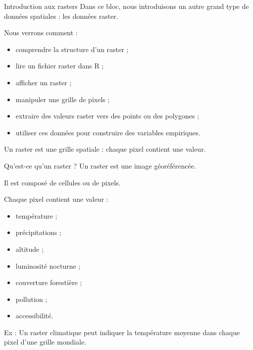 \documentclass[
  10pt,
  ignorenonframetext,
]{beamer}
\begin{document}
\begin{frame}{Introduction aux rasters}
\label{introduction-aux-rasters-1}
Dans ce bloc, nous introduisons un autre grand type de données spatiales
: les données raster.

Nous verrons comment :

\begin{itemize}
  \item comprendre la structure d’un raster ;
  \item lire un fichier raster dans R ;
  \item afficher un raster ;
  \item manipuler une grille de pixels ;
  \item extraire des valeurs raster vers des points ou des polygones ;
  \item utiliser ces données pour construire des variables empiriques.
\end{itemize}

Un raster est une grille spatiale : chaque pixel contient une valeur.
\end{frame}

\begin{frame}{Qu'est-ce qu'un raster ?}
\label{quest-ce-quun-raster}
Un raster est une image géoréférencée.

Il est composé de cellules ou de pixels.

Chaque pixel contient une valeur :

\begin{itemize}
  \item température ;
  \item précipitations ;
  \item altitude ;
  \item luminosité nocturne ;
  \item couverture forestière ;
  \item pollution ;
  \item accessibilité.
\end{itemize}

Ex : Un raster climatique peut indiquer la température moyenne dans
chaque pixel d'une grille mondiale.
\end{frame}
\end{document}

